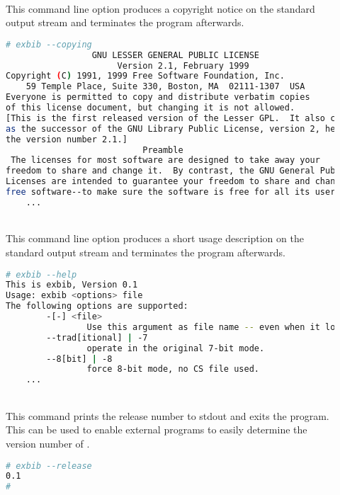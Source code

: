 \begin{description}
\item[]\ \\
  This command line option produces a copyright notice on the standard
  output stream and terminates the program afterwards.
  \begin{lstlisting}[language=sh]
# exbib --copying
                 GNU LESSER GENERAL PUBLIC LICENSE
                      Version 2.1, February 1999
Copyright (C) 1991, 1999 Free Software Foundation, Inc.
    59 Temple Place, Suite 330, Boston, MA  02111-1307  USA
Everyone is permitted to copy and distribute verbatim copies
of this license document, but changing it is not allowed.
[This is the first released version of the Lesser GPL.  It also counts
as the successor of the GNU Library Public License, version 2, hence
the version number 2.1.]
                           Preamble
 The licenses for most software are designed to take away your
freedom to share and change it.  By contrast, the GNU General Public
Licenses are intended to guarantee your freedom to share and change
free software--to make sure the software is free for all its users.
    ...
  \end{lstlisting}

\item[]
\item[]
\item[]\ \\
  This command line option produces a short usage description on the
  standard output stream and terminates the program afterwards.
  \begin{lstlisting}[language=sh]
# exbib --help
This is exbib, Version 0.1
Usage: exbib <options> file
The following options are supported:
        -[-] <file>
                Use this argument as file name -- even when it looks like an option.
        --trad[itional] | -7
                operate in the original 7-bit mode.
        --8[bit] | -8
                force 8-bit mode, no CS file used.
    ...
\end{lstlisting}
  
\item[]\ \\
  This command prints the release number to stdout and exits the
  program. This can be used to enable external programs to easily
  determine the version number of \ExBib.
\begin{lstlisting}[language=sh]
# exbib --release
0.1
#
\end{lstlisting}


\end{description}

